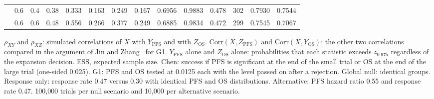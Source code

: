 \begin{table}[htbp]
\begin{threeparttable}
\begin{tabular}{lrrrrrrrrrrrrr}
 & 0.6 & 0.4 & 0.38 & 0.333 & 0.163 & 0.249 & 0.167 & 0.6956 & 0.9883 & 0.478 & 302 & 0.7930 & 0.7544 \\
 & 0.6 & 0.6 & 0.48 & 0.556 & 0.266 & 0.377 & 0.249 & 0.6885 & 0.9834 & 0.472 & 299 & 0.7545 & 0.7067 \\
\bottomrule
\end{tabular}
\begin{tablenotes}
\footnotesize
\item $\rho_{XY}$ and $\rho_{XZ}$: simulated correlations of $X$ with $Y_{\mathrm{PFS}}$ and with $Z_{\mathrm{OS}}$. $\mathrm{Corr}(X, Z_{\mathrm{PFS}})$ and $\mathrm{Corr}(X, Y_{\mathrm{OS}})$: the other two correlations compared in the argument of Jin and Zhang~\cite{Jin2021} for G1. $Y_{\mathrm{PFS}}$ alone and $Z_{\mathrm{OS}}$ alone: probabilities that each statistic exceeds $z_{0.975}$ regardless of the expansion decision. ESS, expected sample size. Chen: success if PFS is significant at the end of the small trial or OS at the end of the large trial (one-sided 0.025). G1: PFS and OS tested at 0.0125 each with the level passed on after a rejection. Global null: identical groups. Response only: response rate 0.47 versus 0.30 with identical PFS and OS distributions. Alternative: PFS hazard ratio 0.55 and response rate 0.47. 100,000 trials per null scenario and 10,000 per alternative scenario.
\end{tablenotes}
\end{threeparttable}
\end{table}
